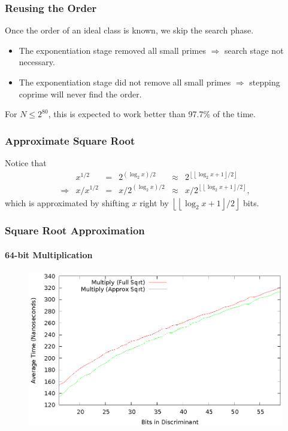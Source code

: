 \documentclass{beamer}
\newcommand{\floor}[1]{\left\lfloor #1 \right\rfloor}
\begin{document}
\begin{frame}
\frametitle{Reusing the Order}

Once the order of an ideal class is known, we skip the search phase.

\begin{itemize}
\item The exponentiation stage removed all small primes $\Rightarrow$ search stage not necessary.

\item The exponentiation stage did not remove all small primes $\Rightarrow$ stepping coprime will never find the order.
\end{itemize}

For $N \le 2^{80}$, this is expected to work better than 97.7\% of the time.

\end{frame}




\begin{frame}
\frametitle{Approximate Square Root}
Notice that
\begin{equation*}
\begin{array}{rrlrlr}
	& x^{1/2} &=& 2^{(\log_2x)/2} &\approx& 2^{\floor{\floor{\log_2x+1}/2}} \\
	\Rightarrow & x / x^{1/2} &=& x / 2^{(\log_2x)/2} &\approx& x / 2^{\floor{\floor{\log_2x+1}/2}},
\end{array}
\end{equation*}
which is approximated by shifting $x$ right by $\floor{\floor{\log_2x+1}/2}$ bits.
\end{frame}

\begin{frame}
\frametitle{Square Root Approximation}
\framesubtitle{64-bit Multiplication}
\begin{figure}
\includegraphics[scale=0.86]{compose-sqrtopt-64}
\end{figure}
\end{frame}
\end{document}
